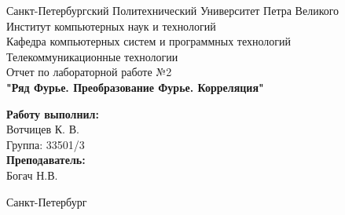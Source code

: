 \documentclass[a4paper]{article}
\begin{document}

\begin{titlepage}	%

	\begin{center}		%

		\large Санкт-Петербургский Политехнический Университет Петра Великого\\
		\large Институт компьютерных наук и технологий \\
		\large Кафедра компьютерных систем и программных технологий\\[6cm]
		
		\huge Телекоммуникационные технологии\\[0.5cm] %
		\large Отчет по лабораторной работе №2 \\[0.2cm]
		\large\textbf{"Ряд Фурье. Преобразование Фурье. Корреляция"}\\[5cm]

	\end{center}


	\begin{flushright} %
		\begin{minipage}{0.25\textwidth} %
			\begin{flushleft} %

				\large\textbf{Работу выполнил:}\\
				\large Вотчицев К. В.\\
				\large {Группа:} 33501/3\\
				
				\large \textbf{Преподаватель:}\\
				\large Богач Н.В.\

			\end{flushleft}
		\end{minipage}
	\end{flushright}
	
	\vfill %

	\begin{center}
	\large Санкт-Петербург\\
	\large \the\year %
	\end{center} %

\thispagestyle{empty} %
\end{titlepage} %
\end{document}
